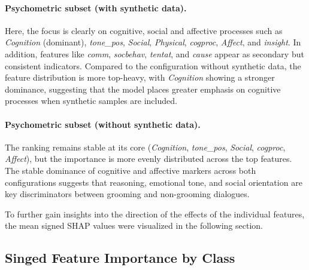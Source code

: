 \paragraph{Psychometric subset (with synthetic data).}
Here, the focus is clearly on cognitive, social and affective processes such as \textit{Cognition} (dominant), \textit{tone\_pos}, \textit{Social}, \textit{Physical}, \textit{cogproc}, \textit{Affect}, and \textit{insight}. In addition, features like \textit{comm}, \textit{socbehav}, \textit{tentat}, and \textit{cause} appear as secondary but consistent indicators. Compared to the configuration without synthetic data, the feature distribution is more top-heavy, with \textit{Cognition} showing a stronger dominance, suggesting that the model places greater emphasis on cognitive processes when synthetic samples are included.

\paragraph{Psychometric subset (without synthetic data).}
The ranking remains stable at its core (\textit{Cognition}, \textit{tone\_pos}, \textit{Social}, \textit{cogproc}, \textit{Affect}), but the importance is more evenly distributed across the top features. The stable dominance of cognitive and affective markers across both configurations suggests that reasoning, emotional tone, and social orientation are key discriminators between grooming and non-grooming dialogues.

To further gain insights into the direction of the effects of the individual features, the mean signed SHAP values were visualized in the following section.


\subsection{Singed Feature Importance by Class}

